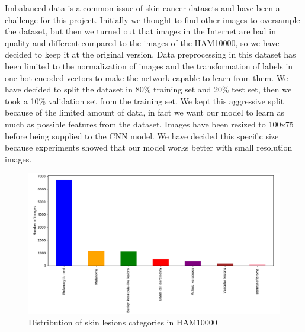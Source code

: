 	Imbalanced data is a common issue of skin cancer datasets and have been a challenge for this project. Initially we thought to find other images to oversample the dataset, but then we turned out that images in the Internet are bad in quality and different compared to the images of the HAM10000, so we have decided to keep it at the original version.
	Data preprocessing in this dataset has been limited to the normalization of images and the transformation of labels in one-hot encoded vectors to make the network capable to learn from them. We have decided to split the dataset in 80\% training set and 20\% test set, then we took a 10\% validation set from the training set. We kept this aggressive split because of the limited amount of data, in fact we want our model to learn as much as possible features from the dataset. Images have been resized to 100x75 before being supplied to the CNN model. We have decided this specific size because experiments showed that our model works better with small resolution images.
	
	\begin{figure}[H]
		\centering
		\includegraphics[width=15cm]{images/graph1.png}
		\caption{Distribution of skin lesions categories in HAM10000}
		\label{fig:graph1}
	\end{figure}